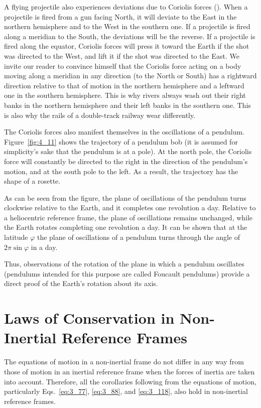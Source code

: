 A flying projectile also experiences deviations due to Coriolis forces (). When a projectile is fired from a gun facing North, it will deviate to the East in the northern hemisphere and to the West in the southern one. If a projectile is fired along a meridian to the South, the deviations will be the reverse. If a projectile is fired along the equator, Coriolis forces will press it toward the Earth if the shot was directed to the West, and lift it if the shot was directed to the East. We invite our reader to convince himself that the Coriolis force acting on a body moving along a meridian in any direction (to the North or South) has a rightward direction relative to that of motion in the northern hemisphere and a leftward one in the southern hemisphere. This is why rivers always wash out their right banks in the northern hemisphere and their left banks in the southern one. This is also why the rails of a double-track railway wear differently.

The Coriolis forces also manifest themselves in the oscillations of a pendulum. Figure~\ref{fig:4_11} shows the trajectory of a pendulum bob (it is assumed for simplicity's sake that the pendulum is at a pole). At the north pole, the Coriolis force will constantly be directed to the right in the direction of the pendulum's motion, and at the south pole to the left. As a result, the trajectory has the shape of a rosette. 

As can be seen from the figure, the plane of oscillations of the pendulum turns clockwise relative to the Earth, and it completes one revolution a day. Relative to a heliocentric reference frame, the plane of oscillations remains unchanged, while the Earth rotates completing one revolution a day. It can be shown that at the latitude $\varphi$ the plane of oscillations of a pendulum turns through the angle of $2\pi\sin\varphi$ in a day.

Thus, observations of the rotation of the plane in which a pendulum oscillates (pendulums intended for this purpose are called Foucault pendulums) provide a direct proof of the Earth's rotation about its axis.

\section{Laws of Conservation in Non-Inertial Reference Frames}\label{sec:4_4}

The equations of motion in a non-inertial frame do not differ in any way from those of motion in an inertial reference frame when the forces of inertia are taken into account. Therefore, all the corollaries following from the equations of motion, particularly Eqs.~\eqref{eq:3_77}, \eqref{eq:3_88}, and \eqref{eq:3_118}, also hold in non-inertial reference frames.

